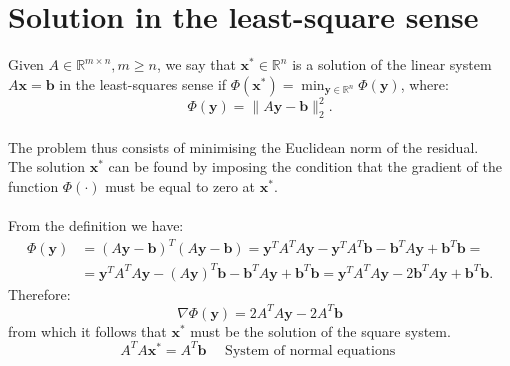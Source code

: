 \documentclass[11pt]{book}
\begin{document}
\section*{Solution in the least-square sense}
Given $A \in \mathbb{R}^{m \times n}, m \geq n$, we say that $\mathbf{x}^{*} \in \mathbb{R}^{n}$ is a solution of the linear system $A \mathbf{x}=\mathbf{b}$ in the least-squares sense if $\Phi\left(\mathbf{x}^{*}\right)=\min _{\mathbf{y} \in \mathbb{R}^{n}} \Phi(\mathbf{y})$,
where:
$$\Phi(\mathbf{y})=\|A \mathbf{y}-\mathbf{b}\|_{2}^{2}.$$\\
The problem thus consists of minimising the Euclidean norm of the residual.\\
The solution $\mathbf{x}^{*}$ can be found by imposing the condition that the gradient of the function $\Phi(\cdot)$ must be equal to zero at $\mathbf{x}^{*}$.\\ \\
From the definition we have:
$$
\begin{aligned}
\Phi(\mathbf{y}) & =(A \mathbf{y}-\mathbf{b})^{T}(A \mathbf{y}-\mathbf{b}) = \mathbf{y}^{T} A^{T} A \mathbf{y} - \mathbf{y}^TA^T\mathbf{b}-\mathbf{b}^T A \mathbf{y}+\mathbf{b}^{T} \mathbf{b} =  \\
&= \mathbf{y}^{T} A^{T} A \mathbf{y}- (A\mathbf{y})^T\mathbf{b}  -\mathbf{b}^T A \mathbf{y}+ \mathbf{b}^{T} \mathbf{b}=\mathbf{y}^{T} A^{T} A \mathbf{y}-2 \mathbf{b}^{T} A \mathbf{y}+\mathbf{b}^{T} \mathbf{b}.
\end{aligned}
$$
Therefore:
$$
\nabla \Phi(\mathbf{y})=2 A^{T} A \mathbf{y}-2 A^{T} \mathbf{b}
$$
from which it follows that $\mathbf{x}^{*}$ must be the solution of the square system.
$$
A^{T} A \mathbf{x}^{*}=A^{T} \mathbf{b} \quad \text { System of normal equations }
$$
\end{document}

